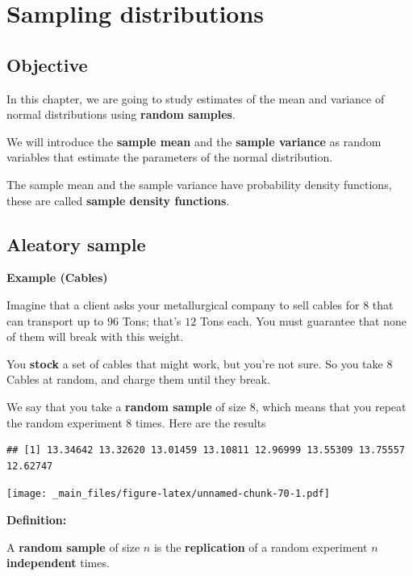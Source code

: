 \documentclass[
]{book}
\begin{document}
\hypertarget{sampling-distributions}{%
\chapter{Sampling distributions}\label{sampling-distributions}}

\hypertarget{objective-6}{%
\section{Objective}\label{objective-6}}

In this chapter, we are going to study estimates of the mean and variance of normal distributions using \textbf{random samples}.

We will introduce the \textbf{sample mean} and the \textbf{sample variance} as random variables that estimate the parameters of the normal distribution.

The sample mean and the sample variance have probability density functions, these are called \textbf{sample density functions}.

\hypertarget{aleatory-sample}{%
\section{Aleatory sample}\label{aleatory-sample}}

\textbf{Example (Cables)}

Imagine that a client asks your metallurgical company to sell cables for \(8\) that can transport up to \(96\) Tons; that's \(12\) Tons each. You must guarantee that none of them will break with this weight.

You \textbf{stock} a set of cables that might work, but you're not sure. So you take \(8\) Cables at random, and charge them until they break.

We say that you take a \textbf{random sample} of size \(8\), which means that you repeat the random experiment \(8\) times. Here are the results

\begin{verbatim}
## [1] 13.34642 13.32620 13.01459 13.10811 12.96999 13.55309 13.75557 12.62747
\end{verbatim}

\texttt{[image: \_main\_files/figure-latex/unnamed-chunk-70-1.pdf]}

\textbf{Definition:}

A \textbf{random sample} of size \(n\) is the \textbf{replication} of a random experiment \(n\) \textbf{independent} times.
\end{document}
